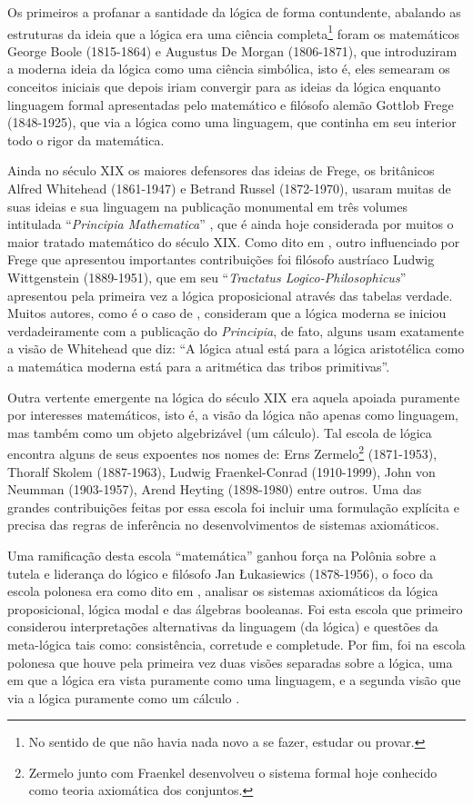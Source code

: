 Os primeiros a profanar a santidade da lógica de forma contundente, abalando as estruturas da ideia que a lógica era uma ciência completa\footnote{No sentido de que não havia nada novo a se fazer, estudar ou provar.} foram os matemáticos George Boole (1815-1864) e Augustus De Morgan (1806-1871), que introduziram a moderna ideia da lógica como uma ciência simbólica, isto é, eles semearam os conceitos iniciais que depois iriam convergir para as ideias da lógica enquanto linguagem formal apresentadas pelo matemático e filósofo alemão Gottlob Frege (1848-1925), que via a lógica como uma linguagem, que continha em seu interior todo o rigor da matemática.

Ainda no século XIX os maiores defensores das ideias de Frege, os britânicos Alfred Whitehead (1861-1947) e Betrand Russel (1872-1970),  usaram muitas de suas ideias e sua linguagem na publicação monumental em três volumes intitulada ``\textit{Principia Mathematica}'' \cite{russel1910principia}, que é ainda hoje considerada por muitos o maior tratado matemático do século XIX. Como dito em \cite{BenjaV1}, outro influenciado por Frege que apresentou importantes contribuições foi filósofo austríaco Ludwig Wittgenstein (1889-1951), que em seu ``\textit{Tractatus Logico-Philosophicus}'' apresentou pela primeira vez a lógica proposicional através das tabelas verdade. Muitos autores, como é o caso de \cite{abe2002-logica}, consideram que a lógica moderna se iniciou verdadeiramente com a publicação do \textit{Principia}, de fato, alguns usam exatamente a visão de Whitehead que diz: ``A lógica atual está para a lógica aristotélica como a matemática moderna está para a aritmética das tribos primitivas''.

Outra vertente emergente na lógica do século XIX era aquela apoiada puramente por interesses matemáticos, isto é, a visão da lógica não apenas como linguagem, mas também como um objeto algebrizável (um cálculo). Tal escola de lógica encontra alguns de seus expoentes nos nomes de: Erns Zermelo\footnote{Zermelo junto com Fraenkel desenvolveu o sistema formal hoje conhecido como teoria axiomática dos conjuntos.} (1871-1953), Thoralf Skolem (1887-1963), Ludwig Fraenkel-Conrad (1910-1999), John von Neumman (1903-1957), Arend Heyting (1898-1980) entre outros. Uma das grandes contribuições feitas por essa escola foi incluir uma formulação explícita e precisa das regras de inferência no desenvolvimentos de sistemas axiomáticos.

Uma ramificação desta escola ``matemática'' ganhou força na Polônia sobre a tutela e liderança do lógico e filósofo Jan \L{}ukasiewics (1878-1956), o foco da escola polonesa era como dito em \cite{BenjaV1}, analisar os sistemas axiomáticos da lógica proposicional, lógica modal e das álgebras booleanas. Foi esta escola que primeiro considerou interpretações alternativas da linguagem (da lógica) e questões da meta-lógica tais como: consistência, corretude e completude. Por fim, foi na escola polonesa que houve pela primeira vez duas visões separadas sobre a lógica, uma em que a lógica era vista puramente como uma linguagem, e a segunda visão que via a lógica puramente como um cálculo \cite{BenjaV1}.


